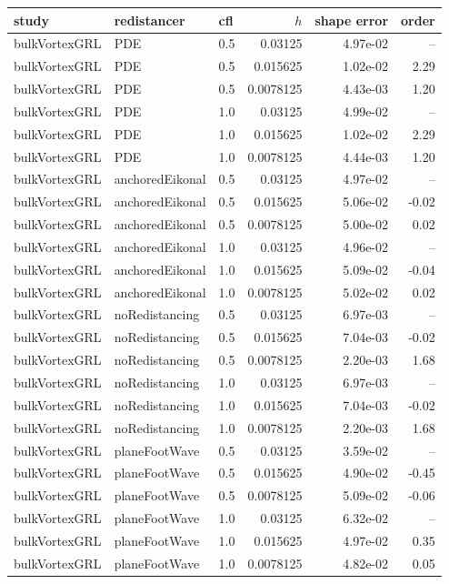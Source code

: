 \begin{tabular}{l l l r r r}
\hline
study & redistancer & cfl & $h$ & shape error & order \\
\hline
bulkVortexGRL & PDE & 0.5 & 0.03125 & 4.97e-02 & -- \\
bulkVortexGRL & PDE & 0.5 & 0.015625 & 1.02e-02 & 2.29 \\
bulkVortexGRL & PDE & 0.5 & 0.0078125 & 4.43e-03 & 1.20 \\
\hline
bulkVortexGRL & PDE & 1.0 & 0.03125 & 4.99e-02 & -- \\
bulkVortexGRL & PDE & 1.0 & 0.015625 & 1.02e-02 & 2.29 \\
bulkVortexGRL & PDE & 1.0 & 0.0078125 & 4.44e-03 & 1.20 \\
\hline
bulkVortexGRL & anchoredEikonal & 0.5 & 0.03125 & 4.97e-02 & -- \\
bulkVortexGRL & anchoredEikonal & 0.5 & 0.015625 & 5.06e-02 & -0.02 \\
bulkVortexGRL & anchoredEikonal & 0.5 & 0.0078125 & 5.00e-02 & 0.02 \\
\hline
bulkVortexGRL & anchoredEikonal & 1.0 & 0.03125 & 4.96e-02 & -- \\
bulkVortexGRL & anchoredEikonal & 1.0 & 0.015625 & 5.09e-02 & -0.04 \\
bulkVortexGRL & anchoredEikonal & 1.0 & 0.0078125 & 5.02e-02 & 0.02 \\
\hline
bulkVortexGRL & noRedistancing & 0.5 & 0.03125 & 6.97e-03 & -- \\
bulkVortexGRL & noRedistancing & 0.5 & 0.015625 & 7.04e-03 & -0.02 \\
bulkVortexGRL & noRedistancing & 0.5 & 0.0078125 & 2.20e-03 & 1.68 \\
\hline
bulkVortexGRL & noRedistancing & 1.0 & 0.03125 & 6.97e-03 & -- \\
bulkVortexGRL & noRedistancing & 1.0 & 0.015625 & 7.04e-03 & -0.02 \\
bulkVortexGRL & noRedistancing & 1.0 & 0.0078125 & 2.20e-03 & 1.68 \\
\hline
bulkVortexGRL & planeFootWave & 0.5 & 0.03125 & 3.59e-02 & -- \\
bulkVortexGRL & planeFootWave & 0.5 & 0.015625 & 4.90e-02 & -0.45 \\
bulkVortexGRL & planeFootWave & 0.5 & 0.0078125 & 5.09e-02 & -0.06 \\
\hline
bulkVortexGRL & planeFootWave & 1.0 & 0.03125 & 6.32e-02 & -- \\
bulkVortexGRL & planeFootWave & 1.0 & 0.015625 & 4.97e-02 & 0.35 \\
bulkVortexGRL & planeFootWave & 1.0 & 0.0078125 & 4.82e-02 & 0.05 \\
\hline
\end{tabular}
